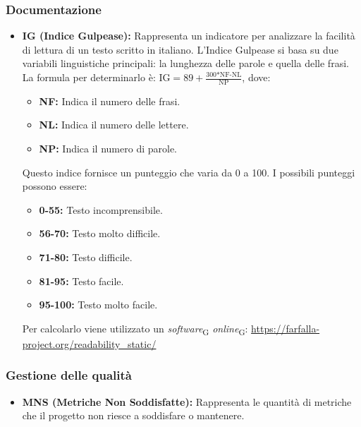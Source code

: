 \subsubsection{Documentazione}
\begin{itemize}
    \item \textbf{IG (Indice Gulpease):} Rappresenta un indicatore per analizzare la facilità di lettura di un testo scritto in italiano. L’Indice Gulpease si basa su due variabili linguistiche principali: la lunghezza delle parole e quella delle frasi. \\
    La formula per determinarlo è: \( \text{IG} = 89+\frac{\text{300*NF-NL}}{\text{NP}} \), dove:
    \begin{itemize}
        \item \textbf{NF:} Indica il numero delle frasi.
        \item \textbf{NL:} Indica il numero delle lettere.
        \item \textbf{NP:} Indica il numero di parole.
    \end{itemize}
    Questo indice fornisce un punteggio che varia da 0 a 100. I possibili punteggi possono essere:
    \begin{itemize}
        \item \textbf{0-55:} Testo incomprensibile.
        \item \textbf{56-70:} Testo molto difficile.
        \item \textbf{71-80:} Testo difficile.
        \item \textbf{81-95:} Testo facile.
        \item \textbf{95-100:} Testo molto facile.
    \end{itemize}
    Per calcolarlo viene utilizzato un \textit{software}\textsubscript{G} \textit{online}\textsubscript{G}: \url{https://farfalla-project.org/readability_static/}
\end{itemize}
\subsubsection{Gestione delle qualità}
\begin{itemize}
    \item \textbf{MNS (Metriche Non Soddisfatte):} Rappresenta le quantità di metriche che il progetto non riesce a soddisfare o mantenere.
\end{itemize}
\newpage
